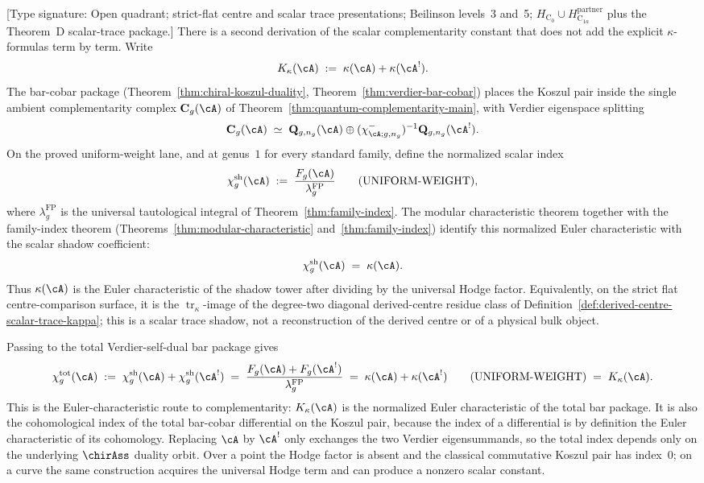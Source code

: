 \begin{remark}
\label{rem:complementarity-index-theory}
\textup{[Type signature: Open quadrant; strict-flat centre and scalar
trace presentations; Beilinson levels~3 and~5;
\(H_{\mathrm C_0}\cup H_{\mathrm C_{1a}}^{\mathrm{partner}}\)
plus the Theorem~D scalar-trace package.]}
There is a second derivation of the scalar complementarity constant
that does not add the explicit $\kappa$-formulas term by term.
Write
\[
K_\kappa(\cA)
\;:=\;
\kappa(\cA) + \kappa(\cA^!).
\]
The bar-cobar package
\textup{(}Theorem~\textup{\ref{thm:chiral-koszul-duality}},
Theorem~\textup{\ref{thm:verdier-bar-cobar}}\textup{)}
places the Koszul pair inside the single ambient complementarity
complex $\mathbf{C}_g(\cA)$ of
Theorem~\textup{\ref{thm:quantum-complementarity-main}}, with Verdier
eigenspace splitting
\[
\mathbf{C}_g(\cA)
\;\simeq\;
\mathbf{Q}_{g,n_g}(\cA)\oplus
(\chi^-_{\cA;g,n_g})^{-1}\mathbf{Q}_{g,n_g}(\cA^!).
\]
On the proved uniform-weight lane, and at genus~$1$ for every standard
family, define the normalized scalar index
\[
\chi_g^{\mathrm{sh}}(\cA)
\;:=\;
\frac{F_g(\cA)}{\lambda_g^{\mathrm{FP}}}
\qquad \textup{(UNIFORM-WEIGHT)},
\]
where $\lambda_g^{\mathrm{FP}}$ is the universal tautological
integral of Theorem~\textup{\ref{thm:family-index}}. The modular
characteristic theorem together with the family-index theorem
\textup{(}Theorems~\textup{\ref{thm:modular-characteristic}}
and~\textup{\ref{thm:family-index}}\textup{)}
identify this normalized Euler characteristic with the scalar shadow
coefficient:
\[
\chi_g^{\mathrm{sh}}(\cA) \;=\; \kappa(\cA).
\]
Thus $\kappa(\cA)$ is the Euler characteristic of the shadow tower
after dividing by the universal Hodge factor. Equivalently, on the
strict flat centre-comparison surface, it is the
\(\operatorname{tr}_{\kappa}\)-image of the degree-two diagonal
derived-centre residue class of
Definition~\ref{def:derived-centre-scalar-trace-kappa}; this is a
scalar trace shadow, not a reconstruction of the derived centre or
of a physical bulk object.

Passing to the total Verdier-self-dual bar package gives
\[
\chi_g^{\mathrm{tot}}(\cA)
\;:=\;
\chi_g^{\mathrm{sh}}(\cA) + \chi_g^{\mathrm{sh}}(\cA^!)
\;=\;
\frac{F_g(\cA) + F_g(\cA^!)}{\lambda_g^{\mathrm{FP}}}
\;=\;
\kappa(\cA) + \kappa(\cA^!)
\qquad \textup{(UNIFORM-WEIGHT)}
\;=\;
K_\kappa(\cA).
\]
This is the Euler-characteristic route to complementarity:
$K_\kappa(\cA)$ is the normalized Euler characteristic of the total
bar package. It is also the cohomological index of the total
bar-cobar differential on the Koszul pair, because the index of a
differential is by definition the Euler characteristic of its
cohomology. Replacing $\cA$ by $\cA^!$ only exchanges the two Verdier
eigensummands, so the total index depends only on the underlying
$\chirAss$ duality orbit. Over a point the Hodge factor is absent and
the classical commutative Koszul pair has index~$0$; on a curve the
same construction acquires the universal Hodge term and can produce a
nonzero scalar constant.


\end{remark}
